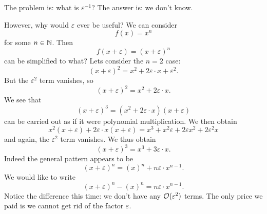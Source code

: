The problem is: what is $\varepsilon^{-1}$? The answer is: we
don't know. 

However, why would $\varepsilon$ ever be useful? We can consider
\begin{equation}
f(x)=x^{n}
\end{equation}
for some $n\in\mathbb{N}$. Then
\begin{equation}
f(x+\varepsilon)=(x+\varepsilon)^{n}
\end{equation}
can be simplified to what? Lets consider the $n=2$ case:
\begin{equation}
(x+\varepsilon)^{2}=x^{2}+2\varepsilon\cdot x+\varepsilon^{2}.
\end{equation}
But the $\varepsilon^{2}$ term vanishes, so
\begin{equation}
(x+\varepsilon)^{2}=x^{2}+2\varepsilon\cdot x.
\end{equation}
We see that
\begin{equation}
(x+\varepsilon)^{3}=(x^{2}+2\varepsilon\cdot x)(x+\varepsilon)
\end{equation}
can be carried out as if it were polynomial multiplication. We
then obtain
\begin{equation}
x^{2}(x+\varepsilon)+2\varepsilon\cdot x(x+\varepsilon)=
x^{3}+x^{2}\varepsilon+2\varepsilon x^{2}+2\varepsilon^{2}x
\end{equation}
and again, the $\varepsilon^{2}$ term vanishes. We thus obtain
\begin{equation}
(x+\varepsilon)^{3} = x^{3}+3\varepsilon\cdot x.
\end{equation}
Indeed  the general pattern appears to be
\begin{equation}
(x+\varepsilon)^{n}=(x)^{n}+n\varepsilon\cdot x^{n-1}.
\end{equation}
We would like to write
\begin{equation}
(x+\varepsilon)^{n}-(x)^{n}=n\varepsilon\cdot x^{n-1}.
\end{equation}
Notice the difference this time: we don't have any
$\mathcal{O}(\varepsilon^{2})$ terms. The only price we paid is we
cannot get rid of the factor $\varepsilon$.


